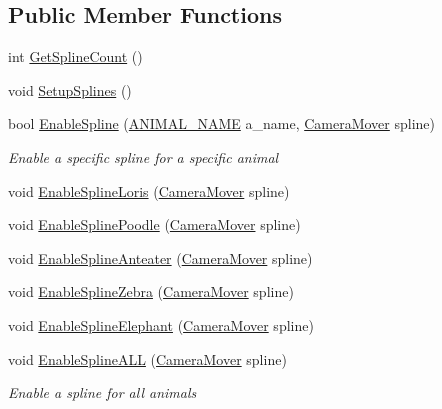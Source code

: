 \subsection*{Public Member Functions}
\begin{DoxyCompactItemize}
\item 
int \mbox{\hyperlink{class_camera_spline_manager_a0b453e27e7dbc789c2da6d9ffa777b2e}{Get\+Spline\+Count}} ()
\item 
void \mbox{\hyperlink{class_camera_spline_manager_abf91230d83f1513d0ad0fbd7d704aa27}{Setup\+Splines}} ()
\item 
bool \mbox{\hyperlink{class_camera_spline_manager_adabd9bdb36a1e809e1df7f8a01fc6a79}{Enable\+Spline}} (\mbox{\hyperlink{_animal_8cs_a2fa5713399b84d1b88dae9196837af50}{A\+N\+I\+M\+A\+L\+\_\+\+N\+A\+ME}} a\+\_\+name, \mbox{\hyperlink{class_camera_mover}{Camera\+Mover}} spline)
\begin{DoxyCompactList}\small\item\em Enable a specific spline for a specific animal \end{DoxyCompactList}\item 
void \mbox{\hyperlink{class_camera_spline_manager_aa1627d7fefa28da4c696265c46f32bb6}{Enable\+Spline\+Loris}} (\mbox{\hyperlink{class_camera_mover}{Camera\+Mover}} spline)
\item 
void \mbox{\hyperlink{class_camera_spline_manager_a0b1b9e87c3e169c39301320f7bffa1ef}{Enable\+Spline\+Poodle}} (\mbox{\hyperlink{class_camera_mover}{Camera\+Mover}} spline)
\item 
void \mbox{\hyperlink{class_camera_spline_manager_ac0b989d5f875491e10640be8e796bf28}{Enable\+Spline\+Anteater}} (\mbox{\hyperlink{class_camera_mover}{Camera\+Mover}} spline)
\item 
void \mbox{\hyperlink{class_camera_spline_manager_af187e76507dac91ddb7c8de51e4decbb}{Enable\+Spline\+Zebra}} (\mbox{\hyperlink{class_camera_mover}{Camera\+Mover}} spline)
\item 
void \mbox{\hyperlink{class_camera_spline_manager_aa2bc822b023e64eb2143f801f8ca0d82}{Enable\+Spline\+Elephant}} (\mbox{\hyperlink{class_camera_mover}{Camera\+Mover}} spline)
\item 
void \mbox{\hyperlink{class_camera_spline_manager_a7f03d96e1777539de176b3ddb37fe8bf}{Enable\+Spline\+A\+LL}} (\mbox{\hyperlink{class_camera_mover}{Camera\+Mover}} spline)
\begin{DoxyCompactList}\small\item\em Enable a spline for all animals \end{DoxyCompactList}\end{DoxyCompactItemize}

